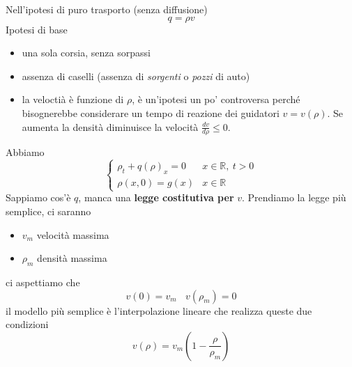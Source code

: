 \documentclass[10pt,a4paper,twoside,openright]{book}
\begin{document}
Nell'ipotesi di puro trasporto (senza diffusione)
\begin{equation}
	q=\rho v
\end{equation}
Ipotesi di base
\begin{itemize}
	\item una sola corsia, senza sorpassi
	\item assenza di caselli (assenza di \textit{sorgenti} o \textit{pozzi} di auto)
	\item la veloctià è funzione di $\rho $, è un'ipotesi un po' controversa perché bisognerebbe considerare un tempo di reazione dei guidatori $v=v( \rho )$. Se aumenta la densità diminuisce la velocità $\frac{dv}{d\rho } \leqslant 0$.
\end{itemize}

Abbiamo
\begin{equation}
	\begin{cases}
		\rho _{t} +q( \rho )_{x} =0 & x\in \mathbb{R} ,\ t >0 \\
		\rho ( x,0) =g( x)          & x\in \mathbb{R}         
	\end{cases}
\end{equation}
Sappiamo cos'è $q$, manca una \textbf{legge costitutiva per }$v$. Prendiamo la legge più semplice, ci saranno
\begin{itemize}
	\item $v_{m}$ velocità massima
	\item $\rho _{m}$ densità massima
\end{itemize}

ci aspettiamo che
\begin{equation*}
	v( 0) =v_{m} \ \ \ \ v( \rho _{m}) =0
\end{equation*}
il modello più semplice è l'interpolazione lineare che realizza queste due condizioni
\begin{equation}
	v( \rho ) =v_{m}\left( 1-\frac{\rho }{\rho _{m}}\right)
\end{equation}
	
\end{document}

